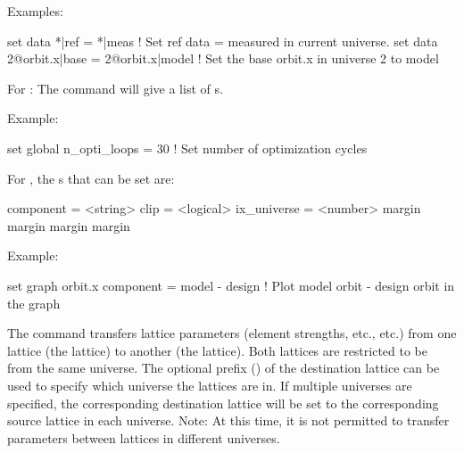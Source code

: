 {{\begin{description}
Examples:
\begin{example}
  set data *|ref = *|meas       ! Set ref data = measured in current universe.
  set data 2@orbit.x|base = 2@orbit.x|model 
                                ! Set the base orbit.x in universe 2 to model
\end{example}


\item[set global <component> = <value>] \Newline

For : The  command will give a list of 
s.

Example:
\begin{example}
  set global n_opti_loops = 30  ! Set number of optimization cycles
\end{example}


\item[set graph <graph> <component> = <value>] \Newline

For , the s that can be set are:
\begin{example}
  component   = <string>
  clip        = <logical>
  ix_universe = <number>
  margin%
  margin%
  margin%
  margin%
\end{example}

Example:
\begin{example}
  set graph orbit.x component = model - design  
                          ! Plot model orbit - design orbit in the graph
\end{example}


\item[set lattice \{n@\}<destination_lat> = <source_lat>] \Newline

The  command transfers lattice parameters (element
strengths, etc., etc.) from one lattice (the  lattice) to
another (the  lattice). Both lattices are restricted
to be from the same universe. The optional  prefix
() of the destination lattice can be used to specify
which universe the lattices are in. If multiple universes are
specified, the corresponding destination lattice will be set to the
corresponding source lattice in each universe. Note: At this time, it
is not permitted to transfer parameters between lattices in different
universes.


\end{description}}}
